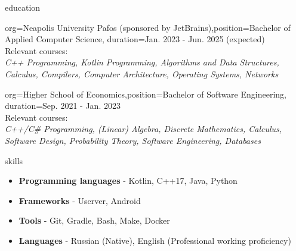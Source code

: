 \documentclass{resume}
\begin{document}
\makeheader

\begin{ResumeSection}{education}
    \begin{ResumeSubsection}{org={Neapolis University Pafos (sponsored by JetBrains)},position={Bachelor of Applied Computer Science}, duration={Jan. 2023 - Jun. 2025 (expected)}} \\
    Relevant courses: \\
	\textit{C++ Programming, Kotlin Programming, Algorithms and Data Structures, Calculus, Compilers, Computer Architecture, Operating Systems, Networks}  
    \end{ResumeSubsection}
	\begin{ResumeSubsection}{org={Higher School of Economics},position={Bachelor of Software Engineering}, duration={Sep. 2021 - Jan. 2023}} \\
    Relevant courses: \\
		\textit{C++/C\# Programming, (Linear) Algebra, Discrete Mathematics, Calculus, Software Design, Probability Theory, Software Engineering, Databases}
    \end{ResumeSubsection}
\end{ResumeSection}

\begin{ResumeSection}{skills}
    \newcommand{\skill}[2]{\textbf{#1} - #2}
        \begin{itemize}
            \item \skill{Programming languages}{Kotlin, C++17, Java, Python}
			\item \skill{Frameworks}{Userver, Android}
            \item \skill{Tools}{Git, Gradle, Bash, Make, Docker}
            \item \skill{Languages}{Russian (Native), English (Professional working proficiency)}
        \end{itemize}
\end{ResumeSection}
\end{document}
